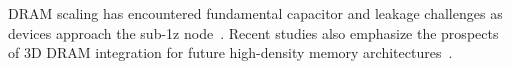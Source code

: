 DRAM scaling has encountered fundamental capacitor and leakage challenges as devices approach the sub-1z node~\cite{lee2020_dram, kim2021_dram}. 
Recent studies also emphasize the prospects of 3D DRAM integration for future high-density memory architectures~\cite{iedm2023_dram}.
